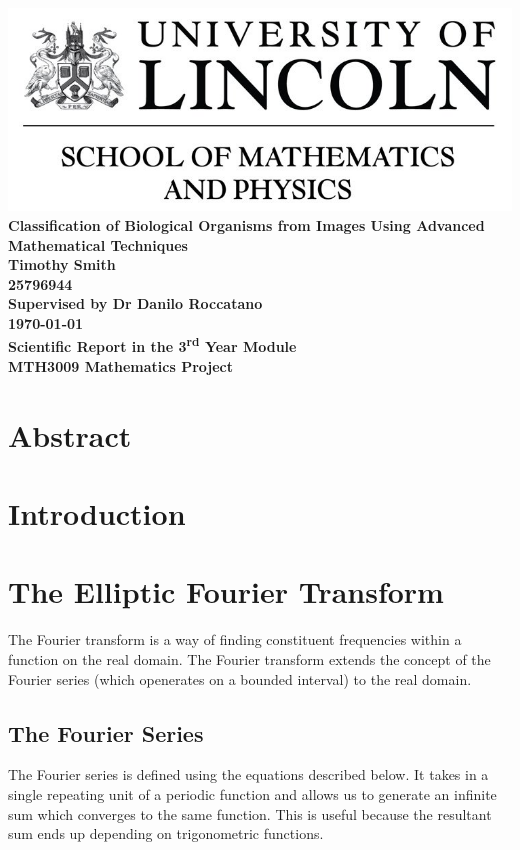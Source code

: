\documentclass[12pt,english]{article}
\begin{document}
\begin{center}
\includegraphics[scale = 0.5]{LincolnLogo}
\newline\newline
\thispagestyle{empty}
    \textbf{\huge{Classification of Biological Organisms from Images Using Advanced Mathematical Techniques} \\
    [100pt] \Large{Timothy Smith\\25796944} \\
    [40pt]\LARGE{Supervised by Dr Danilo Roccatano}\\
    [50pt]\today \\
	[40pt]Scientific Report in the 3\textsuperscript{rd} Year Module\\ MTH3009 Mathematics Project  }
\end{center}

\newpage
\section*{Abstract}

\newpage
\tableofcontents

\newpage
\section{Introduction}
\section{The Elliptic Fourier Transform}
The Fourier transform is a way of finding constituent frequencies within a function on the real domain.
The Fourier transform extends the concept of the Fourier series (which openerates on a bounded interval) to the real
domain.

\subsection{The Fourier Series}
The Fourier series is defined using the equations described below.
It takes in a single repeating unit of a periodic function and allows us to generate an infinite sum which converges
to the same function. This is useful because the resultant sum ends up depending on trigonometric functions.
\end{document}
